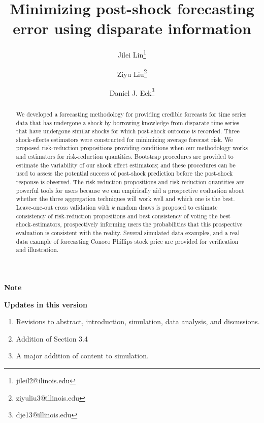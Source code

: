 \documentclass[11pt]{article}
\title{Minimizing post-shock forecasting error using disparate information}
\author{Jilei Lin\thanks{jileil2@ilinois.edu}}
\author{Ziyu Liu\thanks{ziyuliu3@illinois.edu}}
\author{Daniel J. Eck\thanks{dje13@illinois.edu}}
\affil{Department of Statistics, University of Illinois at Urbana-Champaign}
\theoremstyle{definition}
\begin{document}
\begin{center}
  \textbf{Note}
\end{center}




\begin{center}
  \textbf{Updates in this version}
\end{center}

\begin{enumerate}
  \item Revisions to abstract, introduction, simulation, data analysis, and discussions.
  \item Addition of Section 3.4
  \item A major addition of content to simulation.
\end{enumerate}




\newpage 

\maketitle
\begin{abstract}
    We developed a forecasting methodology for providing credible forecasts for time series data that has undergone a shock  by borrowing knowledge from disparate time series that have undergone similar shocks for which post-shock outcome is recorded. Three shock-effects estimators were constructed for minimizing average forecast risk. We proposed risk-reduction propositions providing conditions when our methodology works and estimators for risk-reduction quantities. Bootstrap procedures are provided to estimate the variability of our shock effect estimators; and these procedures can be used to assess the potential success of post-shock prediction before the post-shock response is observed. The risk-reduction propositions and risk-reduction quantities are powerful tools for users because we can empirically aid a prospective evaluation about whether the three aggregation techniques  will work well and which one is the best. Leave-one-out cross validation with $k$ random  draws is proposed to estimate consistency of risk-reduction propositions and best consistency of voting the best shock-estimators, prospectively informing users the probabilities that this prospective evaluation is consistent with the reality. Several simulated data examples, and a real data example of forecasting Conoco Phillips stock price are provided for verification and illustration.
\end{abstract}
\end{document}
